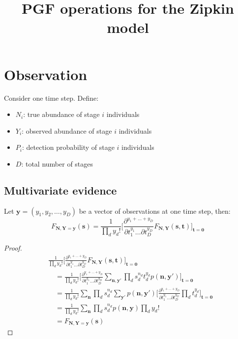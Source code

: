 \documentclass{article}
\title{PGF operations for the Zipkin model}
\begin{document}
\maketitle

\section{Observation}
Consider one time step. Define:
\begin{itemize}
\item $N_i$: true abundance of stage $i$ individuals
\item $Y_i$: observed abundance of stage $i$ individuals
\item $P_i$: detection probability of stage $i$ individuals
\item $D$: total number of stages
\end{itemize}

\subsection{Multivariate evidence}
Let $\mathbf{y} = (y_1, y_2, \ldots, y_D)$ be a vector of observations at one time step, then:
$$
F_{\mathbf{N}, \mathbf{Y} = \mathbf{y}}(\mathbf{s})
= \frac{1}{\prod_d y_d!} \bigg[\frac{\partial^{y_1+\ldots+y_D}}{\partial t_1^{y_1} \ldots \partial t_D^{y_D}} F_{\mathbf{N}, \mathbf{Y}}(\mathbf{s}, \mathbf{t}) \bigg]_{\mathbf{t} = \mathbf{0}}
$$

\begin{proof}
\begin{align*}
&\frac{1}{\prod_d y_d!} \bigg[\frac{\partial^{y_1+\ldots+y_D}}{\partial t_1^{y_1} \ldots \partial t_D^{y_D}} F_{\mathbf{N}, \mathbf{Y}}(\mathbf{s}, \mathbf{t}) \bigg]_{\mathbf{t} = \mathbf{0}} \\
& \quad = \frac{1}{\prod_d y_d!} \bigg[\frac{\partial^{y_1+\ldots+y_D}}{\partial t_1^{y_1} \ldots \partial t_D^{y_D}} \sum_{\mathbf{n}, \mathbf{y}'} \prod_d s_d^{n_d} t_d^{y_d} p(\mathbf{n}, \mathbf{y}') \bigg]_{\mathbf{t} = \mathbf{0}} \\
& \quad = \frac{1}{\prod_d y_d!} \sum_{\mathbf{n}} \prod_d s_d^{n_d} \sum_{\mathbf{y}'} p(\mathbf{n}, \mathbf{y}') \bigg[\frac{\partial^{y_1+\ldots+y_D}}{\partial t_1^{y_1} \ldots \partial t_D^{y_D}} \prod_d t_d^{y_d} \bigg]_{\mathbf{t} = \mathbf{0}} \\
& \quad = \frac{1}{\prod_d y_d!} \sum_{\mathbf{n}} \prod_d s_d^{n_d} p(\mathbf{n}, \mathbf{y}) \prod_d y_d! \\
& \quad = F_{\mathbf{N}, \mathbf{Y} = \mathbf{y}}(\mathbf{s})
\end{align*}
\end{proof}
\end{document}
